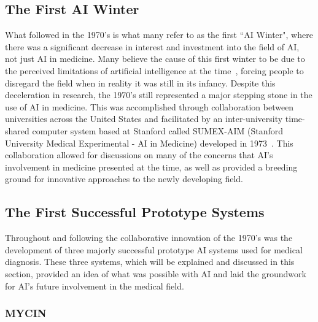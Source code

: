 \documentclass[a4paper]{article}
\begin{document}
\subsection{The First AI Winter}

What followed in the 1970's is what many refer to as the first ``AI Winter", where there was a significant decrease in interest and investment into the field of AI, not just AI in medicine. Many believe the cause of this first winter to be due to the perceived limitations of artificial intelligence at the time~\cite{kaul_history_2020}, forcing people to disregard the field when in reality it was still in its infancy. Despite this deceleration in research, the 1970's still represented a major stepping stone in the use of AI in medicine. This was accomplished through collaboration between universities across the United States and facilitated by an inter-university time-shared computer system based at Stanford called SUMEX-AIM (Stanford University Medical Experimental - AI in Medicine) developed in 1973~\cite{kulikowski_beginnings_2019}. This collaboration allowed for discussions on many of the concerns that AI's involvement in medicine presented at the time, as well as provided a breeding ground for innovative approaches to the newly developing field. 

\subsection{The First Successful Prototype Systems}

Throughout and following the collaborative innovation of the 1970's was the development of three majorly successful prototype AI systems used for medical diagnosis. These three systems, which will be explained and discussed in this section, provided an idea of what was possible with AI and laid the groundwork for AI's future involvement in the medical field.

\subsubsection{MYCIN}
\end{document}
